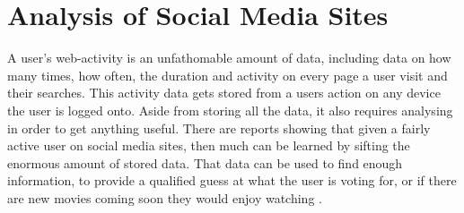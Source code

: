 \chapter{Analysis of Social Media Sites}
A user's web-activity is an unfathomable amount of data, including data on how
many times, how often, the duration and activity on every page a user visit and
their searches. This activity data gets stored from a users action on any device
the user is logged onto. Aside from storing all the data, it also requires
analysing in order to get anything useful.
There are reports showing that given a fairly active user on social media sites,
then much can be learned by sifting the enormous amount of stored data. That
data can be used to find enough information, to provide a qualified guess at
what the user is voting for, or if there are new movies coming soon they would
enjoy watching \citep{Personality}.